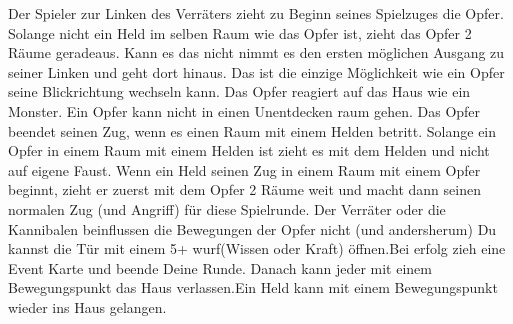   \begin{itemize}
    \bitem Der Spieler zur Linken des Verräters zieht zu Beginn seines Spielzuges die Opfer. Solange nicht ein Held im selben Raum wie das Opfer ist, zieht das Opfer 2 Räume geradeaus. Kann es das nicht nimmt es den ersten möglichen Ausgang zu seiner Linken und geht dort hinaus. Das ist die einzige Möglichkeit wie ein Opfer seine Blickrichtung wechseln kann.
    \bitem Das Opfer reagiert auf das Haus wie ein Monster. Ein Opfer kann nicht in einen Unentdecken raum gehen.
    \bitem Das Opfer beendet seinen Zug, wenn es einen Raum mit einem Helden betritt. Solange ein Opfer in einem Raum mit einem Helden ist zieht es mit dem Helden und nicht auf eigene Faust.
    \bitem Wenn ein Held seinen Zug in einem Raum mit einem Opfer beginnt, zieht er zuerst mit dem Opfer 2 Räume weit und macht dann seinen normalen Zug (und Angriff) für diese Spielrunde.
    \bitem Der Verräter oder die Kannibalen beinflussen die Bewegungen der Opfer nicht (und andersherum)
    \bitem Du kannst die Tür mit einem 5+ wurf(Wissen oder Kraft) öffnen.Bei erfolg zieh eine Event Karte und beende Deine Runde. Danach kann jeder mit einem Bewegungspunkt das Haus verlassen.Ein Held kann mit einem Bewegungspunkt wieder ins Haus gelangen.
    \end{itemize}

